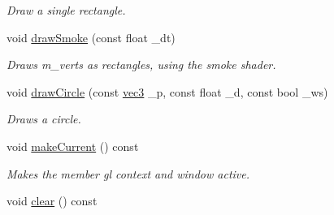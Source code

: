 \begin{DoxyCompactItemize}
\begin{DoxyCompactList}\small\item\em Draw a single rectangle. \end{DoxyCompactList}\item 
void \hyperlink{classrenderer__ngl_a00d1db511cd9a1b1e23e0e0297faee9b}{draw\-Smoke} (const float \-\_\-dt)
\begin{DoxyCompactList}\small\item\em Draws m\-\_\-verts as rectangles, using the smoke shader. \end{DoxyCompactList}\item 
void \hyperlink{classrenderer__ngl_a17eb2048a47bb90a66277102653af4f0}{draw\-Circle} (const \hyperlink{structvec3}{vec3} \-\_\-p, const float \-\_\-d, const bool \-\_\-ws)
\begin{DoxyCompactList}\small\item\em Draws a circle. \end{DoxyCompactList}\item 
\hypertarget{classrenderer__ngl_ac7cd899413624ff605b81f7aa6d02b94}{void \hyperlink{classrenderer__ngl_ac7cd899413624ff605b81f7aa6d02b94}{make\-Current} () const }\label{classrenderer__ngl_ac7cd899413624ff605b81f7aa6d02b94}

\begin{DoxyCompactList}\small\item\em Makes the member gl context and window active. \end{DoxyCompactList}\item 
\hypertarget{classrenderer__ngl_a907b24556b5dbb90fd87386ebbee9d1f}{void \hyperlink{classrenderer__ngl_a907b24556b5dbb90fd87386ebbee9d1f}{clear} () const }\label{classrenderer__ngl_a907b24556b5dbb90fd87386ebbee9d1f}


\end{DoxyCompactItemize}
